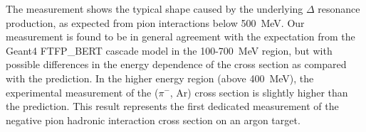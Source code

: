 \documentclass[%
 floatfix,
 reprint,
 twocolumn,
superscriptaddress,
showpacs,preprintnumbers,
 amsmath,amssymb,
 aps,
prd,
]{revtex4-1}
\begin{document}
The measurement shows the typical shape caused by the underlying $\Delta$ resonance production, as expected from pion interactions below 500~MeV.
Our measurement is found to be in general agreement with the expectation from the Geant4 FTFP\_BERT cascade model in the 100-700~MeV region, but with possible differences in the energy dependence of the cross section as compared with the prediction. In the higher energy region (above 400~MeV), the experimental measurement of the ($\pi^-$, Ar) cross section is slightly higher than the prediction. This result represents the first dedicated measurement of the negative pion hadronic interaction cross section on an argon target. 


\begin{comment}
\begin{table*}[p]
\caption{\label{tab:XSsummary} Results summary, including slice counts and corrections for backgrounds and reconstruction effects.} 
\begin{ruledtabular}
\begin{tabular}{cccccccc}
$[E^\text{kin}_{\text{MIN}}, E^\text{kin}_{\text{MAX}}]$& $\sigma$ Geant4  & $\sigma_{\text{TOT}}$ & Stat $\bigoplus$ Syst  & $N^{ \text{Data}}_{ \text{Int}}$
& $N^{ \text{Data}}_{ \text{Inc}}$ & $C^{\pi \text{MC}}_{\text{Int}} / C^{\pi \text{MC}}_{\text{Inc}}$ & $ \psi^{\text{Inc}}/\psi^{\text{Int}}$ \\ 
(MeV)& (Barn)& (Barn) & Uncertainty (Barn) & & & &  \\\hline
& & & & & & & \\
Low E Tune& & & & & & & \\
& & & & & & & \\
$[ 100. , 150. ]$& 1.61 $\pm$ 0.08 & 1.46 &+0.07/-0.06 & 1642 & 102070 & $1.13 \pm 0.03$ & $0.80 \pm 0.05$\\
$[ 150. , 200. ]$& 1.49 $\pm$ 0.07 & 1.47 &+0.03/-0.03 & 2078 & 141574 & $1.11 \pm 0.02$ & $0.89 \pm 0.02$\\
$[ 200. , 250. ]$& 1.33 $\pm$ 0.07 & 1.41 &+0.07/-0.07 & 1944 & 143522 & $1.10 \pm 0.03$ & $0.93 \pm 0.05$\\
$[ 250. , 300. ]$& 1.21 $\pm$ 0.06 & 1.30 &+0.04/-0.05 & 1352 & 111641 & $1.09 \pm 0.03$ & $0.97 \pm 0.06$\\
$[ 300. , 350. ]$& 1.07 $\pm$ 0.05 & 1.07 &+0.11/-0.09 & 671  & 67668  & $1.08 \pm 0.05$ & $0.99 \pm 0.04$\\
$[ 350. , 400. ]$& 0.96 $\pm$ 0.05 & 1.03 &+0.09/-0.11 & 227  & 24041  & $1.07 \pm 0.08$ & $1.01 \pm 0.02$\\

\end{comment}
\end{document}
